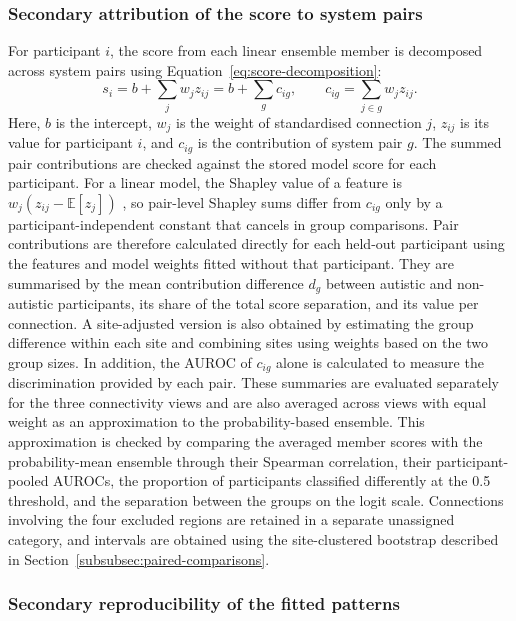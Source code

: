 \subsubsection{Secondary attribution of the score to system pairs}
\label{subsubsec:pair-contributions}

For participant $i$, the score from each linear ensemble member is decomposed across system pairs using Equation~\eqref{eq:score-decomposition}:
\begin{equation}
s_i
=
b + \sum_{j} w_j z_{ij}
=
b + \sum_{g} c_{ig},
\qquad
c_{ig} = \sum_{j\in g} w_j z_{ij}.
\label{eq:score-decomposition}
\end{equation}
Here, $b$ is the intercept, $w_j$ is the weight of standardised connection $j$, $z_{ij}$ is its value for participant $i$, and $c_{ig}$ is the contribution of system pair $g$. The summed pair contributions are checked against the stored model score for each participant. For a linear model, the Shapley value of a feature is $w_j\left(z_{ij}-\mathbb{E}[z_j]\right)$ \citep{LundbergLee2017}, so pair-level Shapley sums differ from $c_{ig}$ only by a participant-independent constant that cancels in group comparisons. Pair contributions are therefore calculated directly for each held-out participant using the features and model weights fitted without that participant. They are summarised by the mean contribution difference $d_g$ between autistic and non-autistic participants, its share of the total score separation, and its value per connection. A site-adjusted version is also obtained by estimating the group difference within each site and combining sites using weights based on the two group sizes. In addition, the AUROC of $c_{ig}$ alone is calculated to measure the discrimination provided by each pair. These summaries are evaluated separately for the three connectivity views and are also averaged across views with equal weight as an approximation to the probability-based ensemble. This approximation is checked by comparing the averaged member scores with the probability-mean ensemble through their Spearman correlation, their participant-pooled AUROCs, the proportion of participants classified differently at the 0.5 threshold, and the separation between the groups on the logit scale. Connections involving the four excluded regions are retained in a separate unassigned category, and intervals are obtained using the site-clustered bootstrap described in Section~\ref{subsubsec:paired-comparisons}.

\subsubsection{Secondary reproducibility of the fitted patterns}
\label{subsubsec:pattern-reproducibility}

